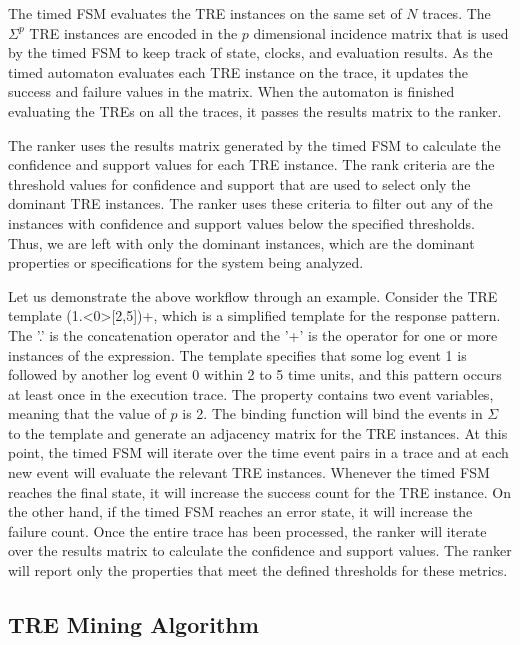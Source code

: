 \documentclass[]{sigplanconf}
\begin{document}
The timed FSM evaluates the TRE instances on the same set of $N$ traces. The $\Sigma^p$ TRE instances are encoded in the $p$ dimensional incidence matrix that is used by the timed FSM to keep track of state, clocks, and evaluation results. As the timed automaton evaluates each TRE instance on the trace, it updates the success and failure values in the matrix. When the automaton is finished evaluating the TREs on all the traces, it passes the results matrix to the ranker.


The ranker uses the results matrix generated by the timed FSM to calculate the confidence and support values for each TRE instance. The rank criteria are the threshold values for confidence and support that are used to select only the dominant TRE instances. The ranker uses these criteria to filter out any of the instances with confidence and support values below the specified thresholds. Thus, we are left with only the dominant instances, which are the dominant properties or specifications for the system being analyzed.



Let us demonstrate the above workflow through an example. Consider the TRE template (1.\textless0\textgreater[2,5])+, which is a simplified template for the response pattern. The '.' is the concatenation operator and the '+' is the operator for one or more instances of the expression.  The template specifies that some log event 1 is followed by another log event 0 within 2 to 5 time units, and this pattern occurs at least once in the execution trace. The property contains two event variables, meaning that the value of $p$ is 2. The binding function will bind the events in $\Sigma$ to the template and generate an adjacency matrix for the TRE instances. At this point, the timed FSM will iterate over the time event pairs in a trace and at each new event will evaluate the relevant TRE instances. Whenever the timed FSM reaches the final state, it will increase the success count for the TRE instance. On the other hand, if the timed FSM reaches an error state, it will increase the failure count. Once the entire trace has been processed, the ranker will iterate over the results matrix to calculate the confidence and support values. The ranker will report only the properties that meet the defined thresholds for these metrics.

\subsection{TRE Mining Algorithm}
\end{document}
